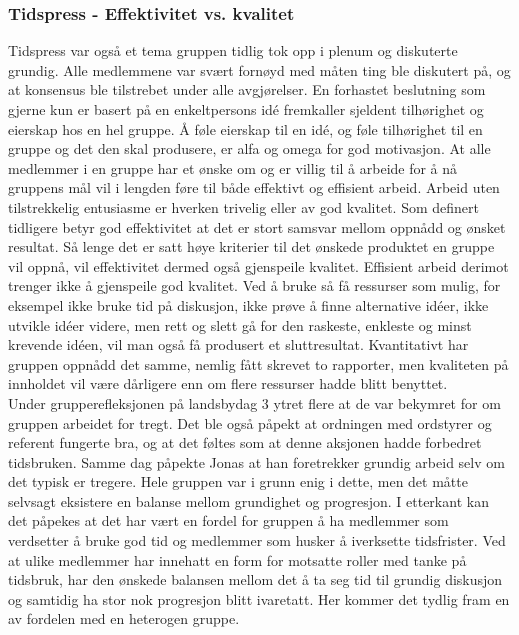 \subsubsection{Tidspress - Effektivitet vs. kvalitet}
Tidspress var også et tema gruppen tidlig tok opp i plenum og diskuterte grundig.
Alle medlemmene var svært fornøyd med måten ting ble diskutert på, og at konsensus ble tilstrebet under alle avgjørelser.
En forhastet beslutning som gjerne kun er basert på en enkeltpersons id\'{e} fremkaller sjeldent tilhørighet og eierskap hos en hel gruppe.
Å føle eierskap til en id\'{e}, og føle tilhørighet til en gruppe og det den skal produsere, er alfa og omega for god motivasjon.
At alle medlemmer i en gruppe har et ønske om og er villig til å arbeide for å nå gruppens mål vil i lengden føre til både effektivt og effisient arbeid.
Arbeid uten tilstrekkelig entusiasme er hverken trivelig eller av god kvalitet.
Som definert tidligere betyr god effektivitet at det er stort samsvar mellom oppnådd og ønsket resultat.
Så lenge det er satt høye kriterier til det ønskede produktet en gruppe vil oppnå, vil effektivitet dermed også gjenspeile kvalitet.
Effisient arbeid derimot trenger ikke å gjenspeile god kvalitet.
Ved å bruke så få ressurser som mulig, for eksempel ikke bruke tid på diskusjon, ikke prøve å finne alternative id\'{e}er, ikke utvikle id\'{e}er videre, men rett og slett gå for den raskeste, enkleste og minst krevende id\'{e}en, vil man også få produsert et sluttresultat.
Kvantitativt har gruppen oppnådd det samme, nemlig fått skrevet to rapporter, men kvaliteten på innholdet vil være dårligere enn om flere ressurser hadde blitt benyttet.\\

Under grupperefleksjonen på landsbydag 3 ytret flere at de var bekymret for om gruppen arbeidet for tregt.
Det ble også påpekt at ordningen med ordstyrer og referent fungerte bra, og at det føltes som at denne aksjonen hadde forbedret tidsbruken.
Samme dag påpekte Jonas at han foretrekker grundig arbeid selv om det typisk er tregere.
Hele gruppen var i grunn enig i dette, men det måtte selvsagt eksistere en balanse mellom grundighet og progresjon.
I etterkant kan det påpekes at det har vært en fordel for gruppen å ha medlemmer som verdsetter å bruke god tid og medlemmer som husker å iverksette tidsfrister.
Ved at ulike medlemmer har innehatt en form for motsatte roller med tanke på tidsbruk, har den ønskede balansen mellom det å ta seg tid til grundig diskusjon og samtidig ha stor nok progresjon blitt ivaretatt. 
Her kommer det tydlig fram en av fordelen med en heterogen gruppe.\\

